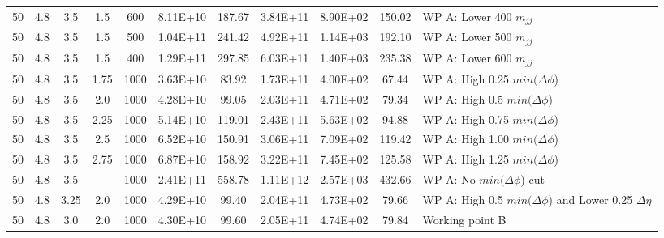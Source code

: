 {\begin{tabular}{|c|c|c|c|c||c|c||c|c|c|l|}
50 & 4.8 & 3.5  & 1.5  & 600  & \num{8.11E+10} &    187.67  & \num{3.84E+11} &    \num{8.90E+02} & 150.02  & WP A: Lower 400 $m_{jj}$ \\
50 & 4.8 & 3.5  & 1.5  & 500  & \num{1.04E+11} &    241.42  & \num{4.92E+11} &    \num{1.14E+03} & 192.10  & WP A: Lower 500 $m_{jj}$ \\
50 & 4.8 & 3.5  & 1.5  & 400  & \num{1.29E+11} &    297.85  & \num{6.03E+11} &    \num{1.40E+03} & 235.38  & WP A: Lower 600 $m_{jj}$ \\
\hline\hline
50 & 4.8 & 3.5  & 1.75 & 1000 & \num{3.63E+10} &    83.92   & \num{1.73E+11} &    \num{4.00E+02} & 67.44   & WP A: High 0.25 $min(\Delta\phi$) \\
50 & 4.8 & 3.5  & 2.0  & 1000 & \num{4.28E+10} &    99.05   & \num{2.03E+11} &    \num{4.71E+02} & 79.34   & WP A: High 0.5 $min(\Delta\phi$) \\
50 & 4.8 & 3.5  & 2.25 & 1000 & \num{5.14E+10} &    119.01  & \num{2.43E+11} &    \num{5.63E+02} & 94.88   & WP A: High 0.75 $min(\Delta\phi$) \\
50 & 4.8 & 3.5  & 2.5  & 1000 & \num{6.52E+10} &    150.91  & \num{3.06E+11} &    \num{7.09E+02} & 119.42  & WP A: High 1.00 $min(\Delta\phi$) \\
50 & 4.8 & 3.5  & 2.75 & 1000 & \num{6.87E+10} &    158.92  & \num{3.22E+11} &    \num{7.45E+02} & 125.58  & WP A: High 1.25 $min(\Delta\phi$) \\
50 & 4.8 & 3.5  & -    & 1000 & \num{2.41E+11} &    558.78  & \num{1.11E+12} &    \num{2.57E+03} & 432.66  & WP A: No $min(\Delta\phi$) cut\\
\hline\hline
50 & 4.8 & 3.25 & 2.0  & 1000 & \num{4.29E+10} &    99.40   & \num{2.04E+11} &    \num{4.73E+02} & 79.66   & WP A: High 0.5 $min(\Delta\phi$) and Lower 0.25 $\Delta\eta$\\
50 & 4.8 & 3.0  & 2.0  & 1000 & \num{4.30E+10} &    99.60   & \num{2.05E+11} &    \num{4.74E+02} & 79.84   & Working point B \\
\hline
\end{tabular}
}

